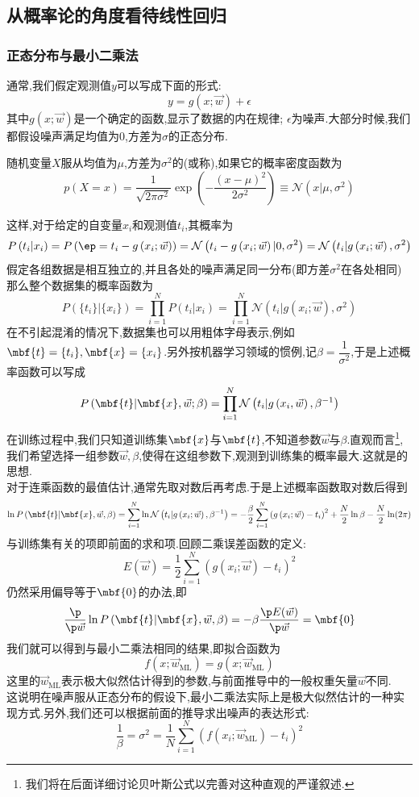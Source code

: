 \documentclass{ctexart}
\begin{document}
\subsection{从概率论的角度看待线性回归}
\subsubsection{正态分布与最小二乘法}
通常,我们假定观测值$y$可以写成下面的形式:
\[y=g(x;\vec{w})+\epsilon\]
其中$g(x;\vec{w})$是一个确定的函数,显示了数据的内在规律; $\epsilon$为噪声.大部分时候,我们都假设噪声满足均值为$0$,方差为$\sigma$的正态分布.
\begin{definition}[正态分布]
    随机变量$X$服从均值为$\mu$,方差为$\sigma^2$的(或称),如果它的概率密度函数为
    \[p(X=x)=\dfrac{1}{\sqrt{2\pi\sigma^2}}\exp\left(-\dfrac{(x-\mu)^2}{2\sigma^2}\right)\equiv\mathcal{N}\left(x|\mu,\sigma^2\right)\]
\end{definition}
这样,对于给定的自变量$x_i$和观测值$t_i$,其概率为
\[P\left(t_i|x_i\right)=P\left(\ep=t_i-g\left(x_i;\vec{w}\right)\right)=\mathcal{N}\left(t_i-g\left(x_i;\vec{w}\right)|0,\sigma^2\right)=\mathcal{N}\left(t_i|g\left(x_i;\vec{w}\right),\sigma^2\right)\]
假定各组数据是相互独立的,并且各处的噪声满足同一分布(即方差$\sigma^2$在各处相同)那么整个数据集的概率函数为
\[P\left(\{t_i\}| \{x_i\}\right)=\prod_{i=1}^{N}P\left(t_i|x_i\right)=\prod_{i=1}^{N}\mathcal{N}\left(t_i|g\left(x_i;\vec{w}\right),\sigma^2\right)\]
在不引起混淆的情况下,数据集也可以用粗体字母表示,例如$\mbf{t}=\{t_i\},\mbf{x}=\{x_i\}$.另外按机器学习领域的惯例,记$\beta=\dfrac{1}{\sigma^2}$,于是上述概率函数可以写成
\[P\left(\mbf{t}|\mbf{x},\vec{w};\beta\right)=\prod_{i=1}^{N}\mathcal{N}\left(t_i|g\left(x_i,\vec{w}\right),\beta^{-1}\right)\]
在训练过程中,我们只知道训练集$\mbf{x}$与$\mbf{t}$,不知道参数$\vec{w}$与$\beta$.直观而言\footnote{我们将在后面详细讨论贝叶斯公式以完善对这种直观的严谨叙述.},我们希望选择一组参数$\vec{w},\beta$,使得在这组参数下,观测到训练集的概率最大.这就是的思想.\\
\indent 对于连乘函数的最值估计,通常先取对数后再考虑.于是上述概率函数取对数后得到
\[\ln P\left(\mbf{t}|\mbf{x},\vec{w},\beta\right)=\sum_{i=1}^{N}\ln\mathcal{N}\left(t_i|g\left(x_i;\vec{w}\right),\beta^{-1}\right)=-\dfrac{\beta}{2}\sum_{i=1}^{N}\left(g\left(x_i;\vec{w}\right)-t_i\right)^2+\dfrac{N}{2}\ln\beta-\dfrac{N}{2}\ln(2\pi)\]
与训练集有关的项即前面的求和项.回顾二乘误差函数的定义:
\[E(\vec{w})=\dfrac12\sum_{i=1}^{N}\left(g(x_i;\vec{w})-t_i\right)^2\]
仍然采用偏导等于$\mbf{0}$的办法,即
\[\dfrac{\p}{\p \vec{w}}\ln P\left(\mbf{t}|\mbf{x},\vec{w},\beta\right)=-\beta\dfrac{\p E(\vec{w})}{\p \vec{w}}=\mbf{0}\]
我们就可以得到与最小二乘法相同的结果,即拟合函数为
\[f\left(x;\vec{w}_{\text{ML}}\right)=g\left(x;\vec{w}_{\text{ML}}\right)\]
这里的$\vec{w}_{\text{ML}}$表示极大似然估计得到的参数,与前面推导中的一般权重矢量$\vec{w}$不同.\\
\indent 这说明在噪声服从正态分布的假设下,最小二乘法实际上是极大似然估计的一种实现方式.另外,我们还可以根据前面的推导求出噪声的表达形式:
\[\dfrac{1}{\beta}=\sigma^2=
\dfrac{1}{N}\sum_{i=1}^{N}\left(f\left(x_i;\vec{w}_{\text{ML}}\right)-t_i\right)^2\]
\end{document}
